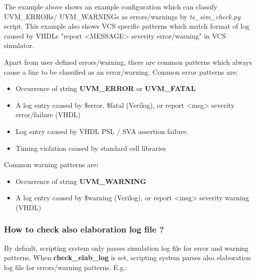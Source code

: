 \documentclass{tropic_design_spec}
\begin{document}
The example above shows an example configuration which can classify UVM_ERRORs/ UVM_WARNINGs
as errors/warnings by \textit{ts_sim_check.py} script. This example also shows VCS specific
patterns which match format of log caused by VHDLs "report <MESSAGE> severity error/warning"
in VCS simulator.

Apart from user defined errors/warning, there are common patterns which always cause
a line to be classified as an error/warning. Common error patterns are:
\begin{itemize}
    \item {Occurrence of string \textbf{UVM_ERROR} or \textbf{UVM_FATAL}}
    \item {A log entry caused by \$error, \$fatal (Verilog), or report <msg> severity
           error/failure (VHDL)}
    \item {Log entry caused by VHDL PSL / SVA assertion failure.}
    \item {Timing violation caused by standard cell libraries}
\end{itemize}

Common warning patterns are:
\begin{itemize}
    \item {Occurrence of string \textbf{UVM_WARNING}}
    \item {A log entry caused by \$warning (Verilog), or report <msg> severity warning (VHDL)}
\end{itemize}



\subsubsection{How to check also elaboration log file ?}
\label{sec:how-to-check-also-elaboration-log}

By default, scripting system only parses simulation log file for error and warning patterns.
When \textbf{check_elab_log} is set, scripting system parses also elaboration log file
for errors/warning patterns. E.g.:
\end{document}
